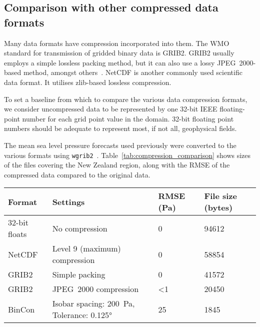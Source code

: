 \documentclass[12pt,a4paper]{article}
\begin{document}
\subsection*{Comparison with other compressed data formats}
\label{sec:compression_comparison}

Many data formats have compression incorporated into them. The WMO standard for
transmission of gridded binary data is GRIB2. GRIB2 usually employs a simple
lossless packing method, but it can also use a lossy JPEG~2000-based method,
amongst others~\citep[p. 143]{wmo2019b}. NetCDF is another commonly used
scientific data format. It utilises zlib-based lossless compression.

To set a baseline from which to compare the various data compression formats,
we consider uncompressed data to be represented by one 32-bit IEEE
floating-point number for each grid point value in the domain. 32-bit floating
point numbers should be adequate to represent most, if not all, geophysical
fields.

The mean sea level pressure forecasts used previously were converted to the
various formats using \texttt{wgrib2}~\citep{noaa2021}.
Table~\ref{tab:compression_comparison} shows sizes of the files covering the
New Zealand region, along with the RMSE of the compressed data compared to the
original data.

\begin{table*}
\centering
\begin{tabular}{llll} \hline
Format         & Settings                                               & RMSE (Pa) & File size (bytes)  \\ \hline
32-bit floats  & No compression                                         & 0         & \num{94612}        \\
NetCDF         & Level 9 (maximum) compression                          & 0         & \num{58854}        \\
GRIB2          & Simple packing                                         & 0         & \num{41572}        \\
GRIB2          & JPEG~2000 compression                                  & <1        & \num{20450}        \\
BinCon         & Isobar spacing: \SI{200}{\Pa}, Tolerance: \ang{0.125}  & 25        & \num{1845}         \\\hline
\end{tabular}
\caption{\label{tab:compression_comparison}Comparison of file sizes for commonly used
data formats.}
\end{table*}
\end{document}
